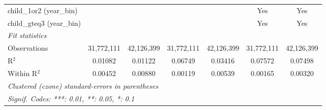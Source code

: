 \begin{tabular}{lcccccc}
child\_1or2 (year\_bin) &  &  &  &  & Yes & Yes\\
child\_gteq3 (year\_bin) &  &  &  &  & Yes & Yes\\
\midrule \emph{Fit statistics}&  & & & & & \\
Observations & 31,772,111&42,126,399&31,772,111&42,126,399&31,772,111&42,126,399\\
R$^2$ & 0.01082&0.01122&0.06749&0.03416&0.07572&0.07498\\
Within R$^2$ & 0.00452&0.00880&0.00119&0.00539&0.00165&0.00320\\
\midrule\midrule\multicolumn{7}{l}{\emph{Clustered (czone) standard-errors in parentheses}}\\
\multicolumn{7}{l}{\emph{Signif. Codes: ***: 0.01, **: 0.05, *: 0.1}}\\
\end{tabular}


